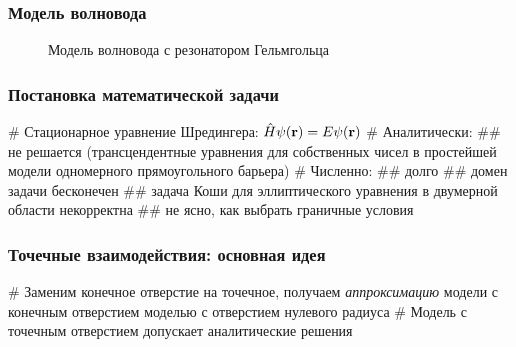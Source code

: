 \documentclass{beamer}
\begin{document}
\begin{frame}[fragile]
\frametitle{Модель волновода}
\begin{figure}
\begin{tikzpicture}[scale=0.5]

\end{tikzpicture}
\caption{Модель волновода с резонатором Гельмгольца}
\end{figure}
\end{frame}

\begin{frame}[fragile]
\frametitle{Постановка математической задачи}
\begin{easylist}[itemize]
# Стационарное уравнение Шредингера: $\hat{H} \psi(\vb{r}) = E \psi(\vb{r})$
# Аналитически:
## не решается (трансцендентные уравнения для собственных чисел в простейшей модели одномерного прямоугольного барьера)
# Численно:
## долго
## домен задачи бесконечен
## задача Коши для эллиптического уравнения в двумерной области некорректна
## не ясно, как выбрать граничные условия
\end{easylist}
\end{frame}



\begin{frame}[fragile]
\frametitle{Точечные взаимодействия: основная идея}
\begin{easylist}[itemize]
# Заменим конечное отверстие на точечное, получаем \textit{аппроксимацию} модели с конечным отверстием моделью с отверстием нулевого радиуса
# Модель с точечным отверстием допускает аналитические решения
\end{easylist}
\end{frame}
\end{document}
